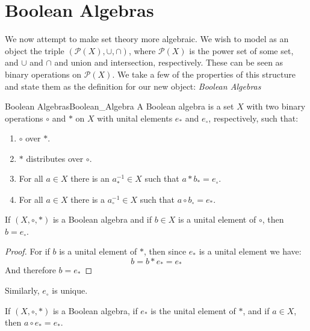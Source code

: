 \section{Boolean Algebras}
    We now attempt to make set theory more algebraic. We wish to model
    as an object the triple $(\mathcal{P}(X),\cup,\cap)$, where
    $\mathcal{P}(X)$ is the \gls{power set} of some set, and $\cup$ and
    $\cap$ and union and intersection, respectively. These can be seen as
    binary operations on $\mathcal{P}(X)$. We take a few of the properties
    of this structure and state them as the definition for our new object:
    \textit{Boolean Algebras}
    \begin{fdefinition}{Boolean Algebras}{Boolean_Algebra}
        A Boolean algebra is a set $X$ with two
         \glspl{binary operation}
        $\circ$ and $*$ on $X$ with \glspl{unital element} $e_{*}$ and
        $e_{\circ}$, respectively, such that:
        \begin{enumerate}
            \item   $\circ$ 
                    over $*$.
            \item   $*$ distributes over $\circ$.
            \item   For all $a\in{X}$ there is an $a_{*}^{\minus{1}}\in{X}$
                    such that $a*b_{*}=e_{\circ}$.
            \item   For all $a\in{X}$ there is a $a_{\circ}^{\minus{1}}\in{X}$
                    such that $a\circ{b}_{\circ}=e_{*}$.
        \end{enumerate}
    \end{fdefinition}
    \begin{theorem}
        If $(X,\circ,*)$ is a Boolean algebra and if $b\in{X}$ is a
        unital element of $\circ$, then $b=e_{\circ}$.
    \end{theorem}
    \begin{proof}
        For if $b$ is a unital element of $*$, then since $e_{*}$ is a
        unital element we have:
        \begin{equation}
            b=b*e_{*}=e_{*}
        \end{equation}
        And therefore $b=e_{*}$
    \end{proof}
    Similarly, $e_{\circ}$ is unique.
    \begin{theorem}
        If $(X,\circ,*)$ is a Boolean algebra, if $e_{*}$ is the unital
        element of $*$, and if $a\in{X}$, then $a\circ{e}_{*}=e_{*}$.
    \end{theorem}
